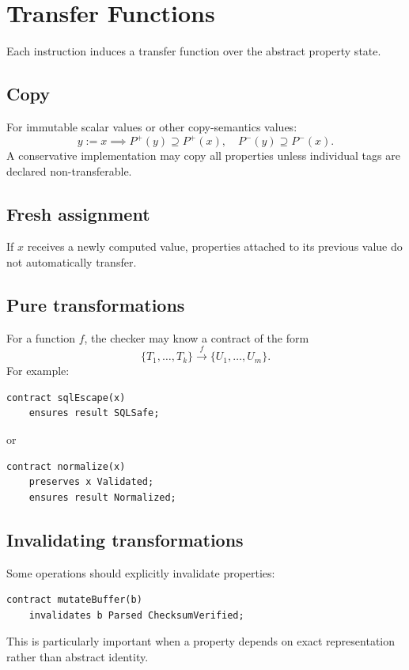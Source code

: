 \documentclass[11pt]{article}
\begin{document}
\section{Transfer Functions}
Each instruction induces a transfer function over the abstract property state.

\subsection{Copy}
For immutable scalar values or other copy-semantics values:
\[
y := x \implies P^+(y) \supseteq P^+(x), \quad P^-(y) \supseteq P^-(x).
\]
A conservative implementation may copy all properties unless individual tags are declared non-transferable.

\subsection{Fresh assignment}
If $x$ receives a newly computed value, properties attached to its previous value do not automatically transfer.

\subsection{Pure transformations}
For a function $f$, the checker may know a contract of the form
\[
\{T_1,\ldots,T_k\} \xrightarrow{f} \{U_1,\ldots,U_m\}.
\]
For example:

\begin{lstlisting}
contract sqlEscape(x)
    ensures result SQLSafe;
\end{lstlisting}

or

\begin{lstlisting}
contract normalize(x)
    preserves x Validated;
    ensures result Normalized;
\end{lstlisting}

\subsection{Invalidating transformations}
Some operations should explicitly invalidate properties:

\begin{lstlisting}
contract mutateBuffer(b)
    invalidates b Parsed ChecksumVerified;
\end{lstlisting}

This is particularly important when a property depends on exact representation rather than abstract identity.
\end{document}
